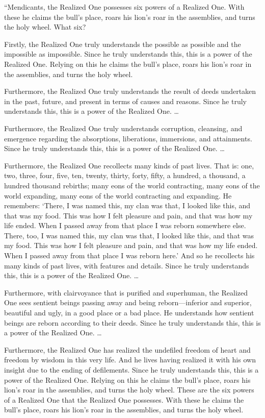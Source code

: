 \documentclass[12pt,openany]{book}%
\begin{document}
“Mendicants, the Realized One possesses six powers of a Realized One. With these he claims the bull’s place, roars his lion’s roar in the assemblies, and turns the holy wheel. What six? 

Firstly, the Realized One truly understands the possible as possible and the impossible as impossible. Since he truly understands this, this is a power of the Realized One. Relying on this he claims the bull’s place, roars his lion’s roar in the assemblies, and turns the holy wheel. 

Furthermore, the Realized One truly understands the result of deeds undertaken in the past, future, and present in terms of causes and reasons. Since he truly understands this, this is a power of the Realized One. … 

Furthermore, the Realized One truly understands corruption, cleansing, and emergence regarding the absorptions, liberations, immersions, and attainments. Since he truly understands this, this is a power of the Realized One. … 

Furthermore, the Realized One recollects many kinds of past lives. That is: one, two, three, four, five, ten, twenty, thirty, forty, fifty, a hundred, a thousand, a hundred thousand rebirths; many eons of the world contracting, many eons of the world expanding, many eons of the world contracting and expanding. He remembers: ‘There, I was named this, my clan was that, I looked like this, and that was my food. This was how I felt pleasure and pain, and that was how my life ended. When I passed away from that place I was reborn somewhere else. There, too, I was named this, my clan was that, I looked like this, and that was my food. This was how I felt pleasure and pain, and that was how my life ended. When I passed away from that place I was reborn here.’ And so he recollects his many kinds of past lives, with features and details. Since he truly understands this, this is a power of the Realized One. … 

Furthermore, with clairvoyance that is purified and superhuman, the Realized One sees sentient beings passing away and being reborn—inferior and superior, beautiful and ugly, in a good place or a bad place. He understands how sentient beings are reborn according to their deeds. Since he truly understands this, this is a power of the Realized One. … 

Furthermore, the Realized One has realized the undefiled freedom of heart and freedom by wisdom in this very life. And he lives having realized it with his own insight due to the ending of defilements. Since he truly understands this, this is a power of the Realized One. Relying on this he claims the bull’s place, roars his lion’s roar in the assemblies, and turns the holy wheel. These are the six powers of a Realized One that the Realized One possesses. With these he claims the bull’s place, roars his lion’s roar in the assemblies, and turns the holy wheel. 
\end{document}
